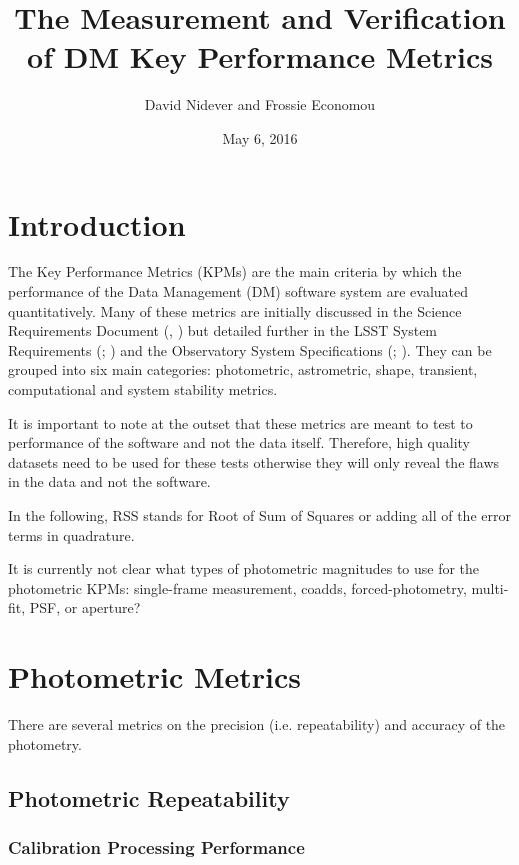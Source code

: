 \documentclass[DM,lsstdraft,toc]{lsstdoc}
\title[Measurement and Verification of KPMs]{The Measurement and Verification of DM Key Performance Metrics}
\author{David Nidever and Frossie Economou}
\date{May 6, 2016}
\begin{document}
\maketitle

\section{Introduction}\label{introduction}

The Key Performance Metrics (KPMs) are the main criteria by which the
performance of the Data Management (DM) software system are evaluated
quantitatively. Many of these metrics are initially discussed in the
Science Requirements Document (\SRD, ) but detailed further in the
LSST System Requirements (\LSR; ) and the Observatory System
Specifications (\OSS; ). They can be grouped into six main
categories: photometric, astrometric, shape, transient, computational
and system stability metrics.

It is important to note at the outset that these metrics are meant to
test to performance of the software and not the data itself. Therefore,
high quality datasets need to be used for these tests otherwise they
will only reveal the flaws in the data and not the software.

In the following, RSS stands for Root of Sum of Squares or adding all of
the error terms in quadrature.

\begin{note}
It is currently not clear what types of photometric magnitudes to use
for the photometric KPMs: single-frame measurement, coadds,
forced-photometry, multi-fit, PSF, or aperture?
\end{note}

\section{Photometric Metrics}\label{photometric-metrics}

There are several metrics on the precision (i.e. repeatability) and
accuracy of the photometry.

\subsection{Photometric Repeatability}\label{photometric-repeatability}

\subsubsection{Calibration Processing
Performance}\label{calibration-processing-performance}
\end{document}
